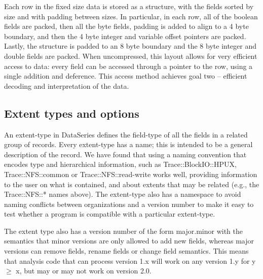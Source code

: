 Each row in the fixed size data is stored as a structure, with the fields sorted by size and with 
padding between sizes.
In particular, in each row, all of the boolean fields are packed, then all
the byte fields, padding is added to align to a 4 byte boundary, and
then the 4 byte integer and variable offset pointers are packed.
Lastly, the structure is padded to an 8 byte boundary and the 8 byte
integer and double fields are packed. When uncompressed, this layout
allows for very efficient access to data: every field can be accessed
through a pointer to the row, using a single addition and deference. 
This access method achieves goal two -- efficient decoding and
interpretation of the data.

\subsection{Extent types and options}\label{sec:extenttype}

An extent-type in DataSeries defines the field-type of all the fields in a
related group of records.  Every extent-type has a name; this is
intended to be a general description of the record.  We have found that
using a naming convention that encodes type and hierarchical information,
such as 
Trace::BlockIO::HPUX, 
Trace::NFS::common or
Trace::NFS::read-write
works well, providing information to the user on what is contained, and 
about extents that may be related (e.g., the Trace::NFS::* names above). 
The extent-type also has a namespace to avoid naming conflicts between
organizations and a version number to make it easy to test whether
a program is compatible with a particular extent-type.


The extent type also has a version number of the form major.minor with the
semantics that minor versions are only allowed to add new fields,
whereas major versions can remove fields, rename fields or change
field semantics.  This means that analysis code that can process
version 1.x will work on any version 1.y for y $\geq$ x, but may or may not
work on version 2.0.

